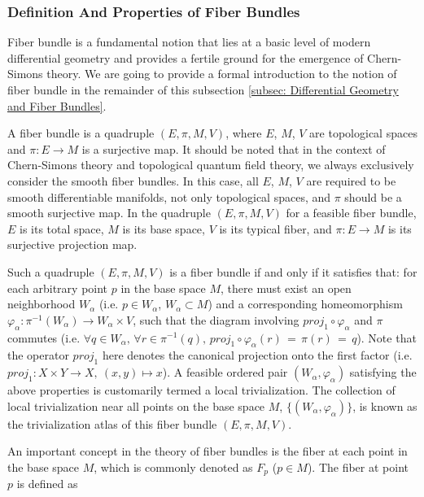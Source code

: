 \subsubsection{Definition And Properties of Fiber Bundles}
\par Fiber bundle is a fundamental notion that lies at a basic level of modern differential geometry and provides a fertile ground for the emergence of Chern-Simons theory. We are going to provide a formal introduction to the notion of fiber bundle in the remainder of this subsection \ref{subsec: Differential Geometry and Fiber Bundles}. 
\par A fiber bundle is a quadruple $\left(E,\pi,M,V\right)$, where $E$, $M$, $V$ are topological spaces and $\pi:E\rightarrow M$ is a surjective map. It should be noted that in the context of Chern-Simons theory and topological quantum field theory, we always exclusively consider the smooth fiber bundles. In this case, all $E$, $M$, $V$ are required to be smooth differentiable manifolds, not only topological spaces, and $\pi$ should be a smooth surjective map. In the quadruple $\left(E,\pi,M,V\right)$ for a feasible fiber bundle, $E$ is its total space, $M$ is its base space, $V$ is its typical fiber, and $\pi:E\rightarrow M$ is its surjective projection map.
\par Such a quadruple $\left(E,\pi,M,V\right)$ is a fiber bundle if and only if it satisfies that: for each arbitrary point $p$ in the base space $M$, there must exist an open neighborhood $W_{\alpha}$ (i.e. $p\in W_{\alpha}$, $W_{\alpha}\subset M$) and a corresponding homeomorphism $\varphi_{\alpha}:\pi^{-1}\left(W_{\alpha}\right)\rightarrow W_{\alpha}\times V$, such that the diagram involving $proj_{1}\circ\varphi_{\alpha}$ and $\pi$ commutes (i.e. $\forall q\in W_{\alpha},\,\forall r\in\pi^{-1}\left(q\right),\,proj_{1}\circ\varphi_{\alpha}\left(r\right)\,=\,\pi\left(r\right)\,=\,q$). Note that the operator $proj_{1}$ here denotes the canonical projection onto the first factor (i.e. $proj_{1}:X\times Y\rightarrow X,\:\left(x,y\right)\mapsto x$).  A feasible ordered pair $\left(W_{\alpha},\varphi_{\alpha}\right)$ satisfying the above properties is customarily termed a local trivialization. The collection of local trivialization near all points on the base space $M$, $\{\left(W_{\alpha},\varphi_{\alpha}\right)\}$, is known as the trivialization atlas of this fiber bundle $\left(E,\pi,M,V\right)$. 
\par An important concept in the theory of fiber bundles is the fiber at each point in the base space $M$, which is commonly denoted as $F_{p}$ ($p\in M$). The fiber at point $p$ is defined as 
